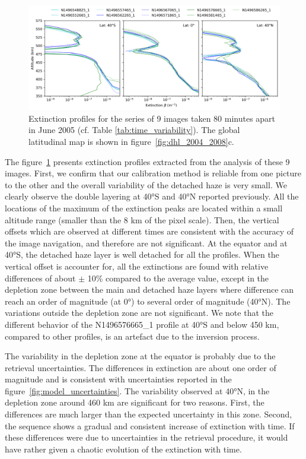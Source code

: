 \begin{figure}[!ht]
    \centering
    \includegraphics[width=\textwidth]{Fig/Time_variability.png}
    \caption{Extinction profiles for the series
    of 9 images taken 80 minutes apart in June 2005 (cf. Table \ref{tab:time_variability}).
    The global latitudinal map is shown in figure~\ref{fig:dhl_2004_2008}c.}
    \label{fig:time_variability}
\end{figure}

The figure~\ref{fig:time_variability} presents extinction profiles extracted from the analysis of these 9 images.
First, we confirm that our calibration method is reliable from one picture to the other and the overall
variability of the detached haze is very small. We clearly observe the double layering at \ang{40}S and \ang{40}N reported
previously. All the locations of the maximum of the extinction peaks are located within a small altitude range (smaller
than the 8 km of the pixel scale). Then, the vertical offsets which are observed at different times are consistent
with  the accuracy of the image navigation, and therefore are not significant. At the equator and at \ang{40}S, the detached
haze layer is well detached for all the profiles. When the vertical offset is accounter for, all the extinctions are found
with relative differences of about $\pm$ 10\% compared to the average value, except in the depletion zone between
the main and detached haze layers where difference can reach an order of magnitude (at \ang{0}) to several order of magnitude
(\ang{40}N). The variations outside the depletion zone are not significant. We note that the different behavior of the
N1496576665\_1 profile at \ang{40}S and below 450 km, compared to other profiles, is an artefact due to the inversion
process.

The variability in the depletion zone at the equator is probably due to the retrieval uncertainties. The differences in
extinction are about one order of magnitude and is consistent with uncertainties reported in the figure~\ref{fig:model_uncertainties}.
The variability observed at \ang{40}N, in the depletion zone around 460 km are significant for two reasons.
First, the differences are much larger than the expected uncertainty in this zone. Second, the sequence shows
a gradual and consistent increase of extinction with time. If these differences were due to uncertainties in
the retrieval procedure, it would have rather given a chaotic evolution of the extinction with time.

